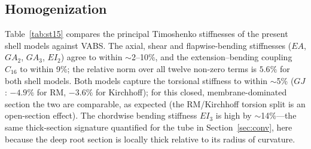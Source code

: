 \documentclass[preprint,12pt]{elsarticle}
\begin{document}
\subsection{Homogenization}
Table~\ref{tab:st15} compares the principal Timoshenko stiffnesses of the
present shell models against VABS. The axial, shear and flapwise-bending
stiffnesses ($EA$, $GA_2$, $GA_3$, $EI_2$) agree to within $\sim$2--10\%, and
the extension--bending coupling $C_{16}$ to within 9\%; the relative norm over
all twelve non-zero terms is $5.6\%$ for both shell models. Both models capture
the torsional stiffness to within $\sim$5\% ($GJ$: $-4.9\%$ for RM, $-3.6\%$ for
Kirchhoff); for this closed, membrane-dominated section the two are comparable,
as expected (the RM/Kirchhoff torsion split is an open-section effect). The chordwise
bending stiffness $EI_3$ is high by $\sim$14\%---the same thick-section
signature quantified for the tube in Section~\ref{sec:conv}, here because the
deep root section is locally thick relative to its radius of curvature.

\begin{table}[t]\centering
\caption{Station-15 principal Timoshenko stiffnesses: present shell models
versus VABS (2D solid FE). The relative norm over all twelve non-zero
$6\times6$ terms is $5.6\%$ for both models.}
\label{tab:st15}
\end{table}
\end{document}
